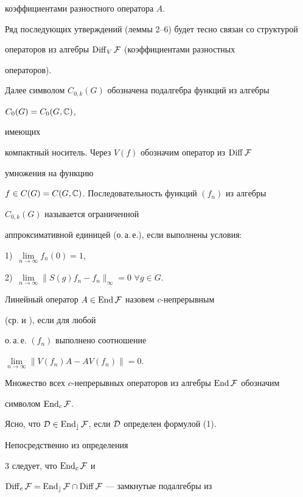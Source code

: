коэффициентами разностного оператора $A$. 


 


Ряд последующих утверждений (леммы 2--6) будет тесно связан со структурой 


операторов из алгебры $\operatorname{Diff}_V\cal F$ (коэффициентами разностных 


операторов). 


 


Далее символом $C_{0,k}(G)$ обозначена подалгебра функций из алгебры 


$C_0(G)=C_0(G,\Bbb C)$, 


имеющих 


компактный носитель. Через $V(f)$ обозначим оператор из $\operatorname{Diff}\cal F$ 


умножения на функцию 


$f\in C(G)=C(G,\Bbb C)$. Последовательность функций $(f_n)$ из алгебры 


$C_{0,k}(G)$ называется ограниченной 


аппроксимативной единицей (о.\,а.\,е.), если выполнены условия:


1)~$\lim\limits_{n\to\infty}f_n(0)=1$, 


2)~$\lim\limits_{n\to\infty}\|S(g)f_n-f_n\|_\infty=0$ $\forall g\in G$. 


 


\begin{defn} Линейный оператор $A\in\operatorname{End}\cal F$ назовем $c$-непрерывным 


(ср.\cite{Muh} и \cite{Slu}), если для любой 


о.\,а.\,е. $(f_n)$ выполнено соотношение 


$\lim\limits_{n\to\infty}\|V(f_n)A-AV(f_n)\|=0$. 


\end{defn} 


 


Множество всех $c$-непрерывных операторов из алгебры $\operatorname{End}\cal F$ обозначим 


символом $\operatorname{End}_c\cal F$. 


Ясно, что $\cal D\in\operatorname{End}_c\cal F$, если $\cal D$ определен формулой (1). 


Непосредственно из определения 


3 следует, что $\operatorname{End}_c\cal F$ и 


$\operatorname{Diff}_c\cal F=\operatorname{End}_c\cal F\cap\operatorname{Diff}\cal F$ --- замкнутые подалгебры из 


